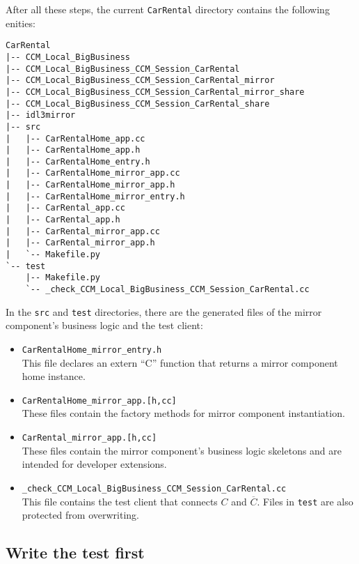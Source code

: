 After all these steps, the current {\tt CarRental} directory contains the following
enities:
\begin{small}
\begin{verbatim}
CarRental
|-- CCM_Local_BigBusiness
|-- CCM_Local_BigBusiness_CCM_Session_CarRental
|-- CCM_Local_BigBusiness_CCM_Session_CarRental_mirror
|-- CCM_Local_BigBusiness_CCM_Session_CarRental_mirror_share
|-- CCM_Local_BigBusiness_CCM_Session_CarRental_share
|-- idl3mirror
|-- src
|   |-- CarRentalHome_app.cc
|   |-- CarRentalHome_app.h
|   |-- CarRentalHome_entry.h
|   |-- CarRentalHome_mirror_app.cc
|   |-- CarRentalHome_mirror_app.h
|   |-- CarRentalHome_mirror_entry.h
|   |-- CarRental_app.cc
|   |-- CarRental_app.h
|   |-- CarRental_mirror_app.cc
|   |-- CarRental_mirror_app.h
|   `-- Makefile.py
`-- test
    |-- Makefile.py
    `-- _check_CCM_Local_BigBusiness_CCM_Session_CarRental.cc
\end{verbatim}
\end{small}

In the {\tt src} and {\tt test} directories, there are the generated files of the mirror
component's business logic and the test client:
\begin{itemize}
\item {\tt CarRentalHome\_mirror\_entry.h} \\
This file declares an extern ``C'' function 
that returns a mirror component home instance.

\item {\tt CarRentalHome\_mirror\_app.[h,cc]} \\
These files contain the factory methods for mirror component instantiation. 

\item {\tt CarRental\_mirror\_app.[h,cc]} \\
These files contain the mirror component's business logic skeletons and are intended
for developer extensions.

\item {\tt \_check\_CCM\_Local\_BigBusiness\_CCM\_Session\_CarRental.cc} \\
This file contains the test client that connects $C$ and $\overline{C}$.  
Files in {\tt test} are also protected from overwriting.
\end{itemize}  




\newpage
\subsection{Write the test first}

